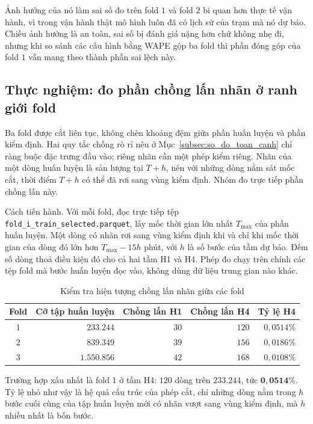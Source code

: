 \documentclass[12pt, a4paper]{report}
\begin{document}
Ảnh hưởng của nó làm sai số đo trên fold $1$ và fold $2$ bi quan hơn thực tế vận
hành, vì trong vận hành thật mô hình luôn đã có lịch sử của trạm mà nó dự báo. Chiều ảnh
hưởng là an toàn, sai số bị đánh giá nặng hơn chứ không nhẹ đi, nhưng khi so sánh các
cấu hình bằng WAPE gộp ba fold thì phần đóng góp của fold $1$ vẫn mang theo thành phần sai
lệch này.

\FloatBarrier
\subsection{Thực nghiệm: đo phần chồng lấn nhãn ở ranh giới fold}

Ba fold được cắt liên tục, không chèn khoảng đệm giữa phần huấn luyện và phần kiểm
định. Hai quy tắc chống rò rỉ nêu ở Mục~\ref{subsec:so_do_toan_canh} chỉ ràng buộc đặc trưng đầu
vào; riêng nhãn cần một phép kiểm riêng. Nhãn của một dòng huấn luyện là sản
lượng tại $T + h$, nên với những dòng nằm sát mốc cắt, thời điểm $T + h$ có thể đã rơi
sang vùng kiểm định. Nhóm đo trực tiếp phần chồng lấn này.

Cách tiến hành. Với mỗi fold, đọc trực tiếp tệp
\texttt{fold\_i\_train\_selected.parquet}, lấy mốc thời gian lớn nhất $T_{\max}$ của phần
huấn luyện. Một dòng có nhãn rơi sang vùng kiểm định khi và chỉ khi mốc thời gian của dòng đó lớn hơn
$T_{\max} - 15h$ phút, với $h$ là số bước của tầm dự báo. Đếm số dòng thoả điều kiện đó
cho cả hai tầm H1 và H4. Phép đo chạy trên chính các tệp fold mà bước huấn luyện đọc
vào, không dùng dữ liệu trung gian nào khác.

\begin{table}[htbp]
\centering
\caption{Kiểm tra hiện tượng chồng lấn nhãn giữa các fold}
\label{tab:chong_lan}
\small
\begin{tabular}{c r r r r}
\toprule
\textbf{Fold} & \textbf{Cỡ tập huấn luyện} & \textbf{Chồng lấn H1} & \textbf{Chồng lấn H4} & \textbf{Tỷ lệ H4} \\
\midrule
$1$ & $233.244$ & $30$ & $120$ & $0{,}0514\%$ \\
$2$ & $839.349$ & $39$ & $156$ & $0{,}0186\%$ \\
$3$ & $1.550.856$ & $42$ & $168$ & $0{,}0108\%$ \\
\bottomrule
\end{tabular}


\end{table}

Trường hợp xấu nhất là fold $1$ ở tầm H4: $120$ dòng trên $233.244$, tức
$\mathbf{0{,}0514\%}$. Tỷ lệ nhỏ như vậy là hệ quả cấu trúc của phép cắt, chỉ những dòng
nằm trong $h$ bước cuối cùng của tập huấn luyện mới có nhãn vượt sang vùng kiểm định, mà
$h$ nhiều nhất là bốn bước.
\end{document}

